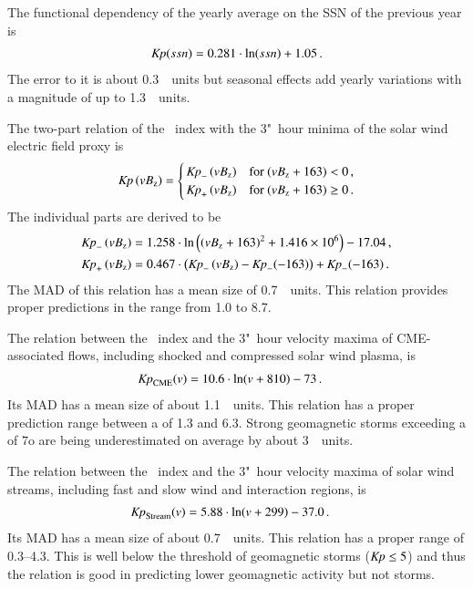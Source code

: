\begin{itemize*}
	\item The functional dependency of the yearly \Kp{} average on the SSN of the previous year is
	\begin{align*}
		\Kp(ssn) = 0.281 \cdot \ln(ssn) + 1.05	\,.
	\end{align*}
	The error to it is about 0.3~\Kp~units but seasonal effects add yearly variations with a magnitude of up to 1.3~\Kp~units.

	\item The two-part relation of the \Kp~index with the 3"~hour minima of the solar wind electric field proxy \vBz{} is
	\begin{align*}
		\text{\Kp}\left(vB_\text{z}\right) =
		\begin{cases}
			\,\text{\Kp}_-\left(vB_\text{z}\right) &\text{for~} (vB_\text{z} + 163) < 0	\,,\\
			\,\text{\Kp}_+\left(vB_\text{z}\right) &\text{for~} (vB_\text{z} + 163) \ge 0	\,.
		\end{cases}
	\end{align*}
	The individual parts are derived to be
	\begin{align*}
		\text{\Kp}_-\left(vB_\text{z}\right) &= 1.258 \cdot \ln\left(\left(vB_\text{z} + 163\right)^2 + \num{1.416e6}\right) - 17.04	\,,\\
		\text{\Kp}_+\left(vB_\text{z}\right) &= 0.467 \cdot \left(\text{\Kp}_-\left(vB_\text{z}\right) - \text{\Kp}_-(-163)\right) + \text{\Kp}_-(-163)	\,.
	\end{align*}
	The MAD of this relation has a mean size of 0.7~\Kp~units. This relation provides proper predictions in the \Kp{} range from \num{1.0} to \num{8.7}.

	\item The relation between the \Kp~index and the 3"~hour velocity maxima of CME-associated flows, including shocked and compressed solar wind plasma, is
	\begin{align*}
		\text{\Kp}_\text{CME}(v) &= 10.6 \cdot \ln(v + 810) - 73	\,.
	\end{align*}
	Its MAD has a mean size of about 1.1~\Kp~units. This relation has a proper prediction range between a \Kp{} of \num{1.3} and \num{6.3}. Strong geomagnetic storms exceeding a \Kp{} of 7o are being underestimated on average by about 3~\Kp~units.

	\item The relation between the \Kp~index and the 3"~hour velocity maxima of solar wind streams, including fast and slow wind and interaction regions, is
	\begin{align*}
		\text{\Kp}_\text{Stream}(v) &= 5.88 \cdot \ln(v + 299) - 37.0	\,.
	\end{align*}
	Its MAD has a mean size of about 0.7~\Kp~units. This relation has a proper \Kp{} range of \numrange{0.3}{4.3}. This is well below the threshold of geomagnetic storms ($\si{\Kp} \leq 5$) and thus the relation is good in predicting lower geomagnetic activity but not storms.
\end{itemize*}

